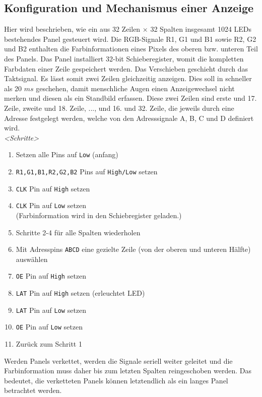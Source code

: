 \subsection{Konfiguration und Mechanismus einer Anzeige}
Hier wird beschrieben, wie ein aus 32 Zeilen $\times$ 32 Spalten insgesamt 1024 LEDs bestehendes Panel gesteuert wird. Die  RGB-Signale R1, G1 und B1 sowie R2, G2 und B2 enthalten die Farbinformationen eines Pixels des oberen bzw. unteren Teil des Panels. Das Panel installiert 32-bit Schieberegister, womit die kompletten Farbdaten einer Zeile gespeichert werden. Das Verschieben geschieht durch das Taktsignal. Es lässt somit zwei Zeilen gleichzeitig anzeigen. Dies soll in schneller als 20 $ms$ geschehen, damit menschliche Augen einen Anzeigewechsel nicht merken und diesen als ein Standbild erfassen. Diese zwei Zeilen sind erste und 17. Zeile, zweite und 18. Zeile, ..., und 16. und 32. Zeile, die jeweils durch eine Adresse festgelegt werden, welche von den Adresssignale A, B, C und D definiert wird.\\

\emph{<Schritte>}
\begin{enumerate}
	\item Setzen alle Pins auf \texttt{Low} (anfang)
	\item \texttt{R1,G1,B1,R2,G2,B2} Pins auf \texttt{High/Low} setzen
	\item \texttt{CLK} Pin auf \texttt{High} setzen
	\item \texttt{CLK} Pin auf \texttt{Low} setzen \\
	(Farbinformation wird in den Schiebregister geladen.)
	\item Schritte 2-4 für alle Spalten wiederholen
	\item Mit Adresspins \texttt{ABCD} eine gezielte Zeile (von der oberen und unteren Hälfte) auswählen
	\item \texttt{OE} Pin auf \texttt{High} setzen
	\item \texttt{LAT} Pin auf \texttt{High} setzen (erleuchtet LED)
	\item \texttt{LAT} Pin auf \texttt{Low} setzen
	\item \texttt{OE} Pin auf \texttt{Low} setzen
	\item Zurück zum Schritt 1
\end{enumerate}

Werden Panels verkettet, werden die Signale seriell weiter geleitet und die Farbinformation muss daher bis zum letzten Spalten reingeschoben werden. Das bedeutet, die verketteten Panels können letztendlich als ein langes Panel betrachtet werden.

